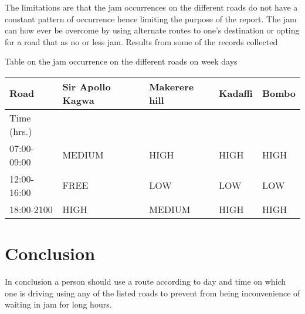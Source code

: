 \documentclass[options]{article}
\begin{document}
The limitations are that the jam occurrences on the different roads do not have a constant pattern of occurrence hence limiting the purpose of the report.
The jam can how ever be overcome by using alternate routes to one’s destination or opting for a road that as no or less jam.
Results from some of the records collected 


Table on the jam occurrence on the different roads on week days

\begin{tabular}{|l|l|l|l|l|}
\hline
Road& Sir Apollo Kagwa & Makerere hill & Kadaffi & Bombo \\
\hline
Time (hrs.) &  & & & \\
\hline
07:00-09:00& MEDIUM &HIGH&HIGH&HIGH \\
\hline
12:00-16:00 &FREE  & LOW&LOW & LOW\\
\hline
18:00-2100&HIGH  &MEDIUM & HIGH& HIGH\\
\hline
\end{tabular}


\section{\textbf{Conclusion }} 
In conclusion a person should use a route according to day and time on which one is driving using any of the listed roads to prevent from being inconvenience of waiting in jam for long hours.
\end{document}
